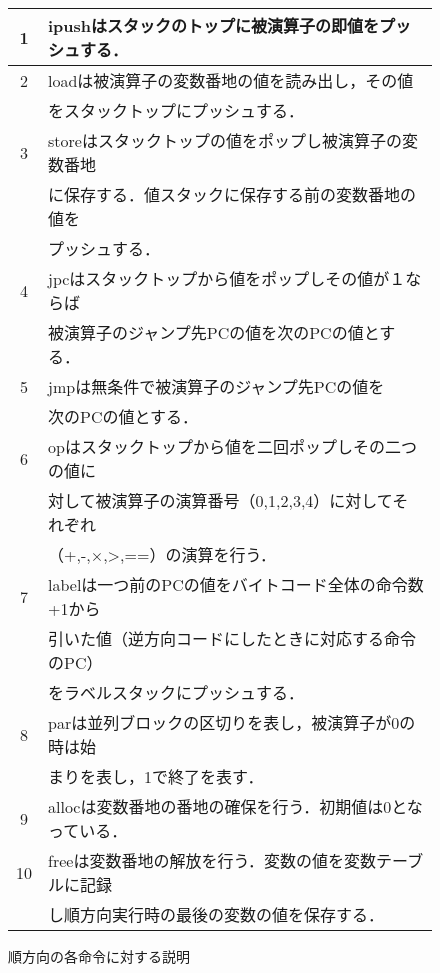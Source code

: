 \documentclass[submit,PRO]{ipsj}
\begin{document}
\begin{figure}[tb]
\caption{順方向の各命令に対する説明}
\label{tab:expfor}
\begin{center}
\begin{tabular}[t]{|c|l|}\hline
1 &ipushはスタックのトップに被演算子の即値をプッシュする． \\\hline

2 & loadは被演算子の変数番地の値を読み出し，その値\\

& をスタックトップにプッシュする．\\\hline

3& storeはスタックトップの値をポップし被演算子の変数番地\\ 

& に保存する．値スタックに保存する前の変数番地の値を\\ &プッシュする．\\\hline

4 &jpcはスタックトップから値をポップしその値が１ならば\\ & 被演算子のジャンプ先PCの値を次のPCの値とする． \\\hline

5& jmpは無条件で被演算子のジャンプ先PCの値を\\ & 次のPCの値とする．\\\hline



6& opはスタックトップから値を二回ポップしその二つの値に\\ &対して被演算子の演算番号（0,1,2,3,4）に対してそれぞれ\\ &（+,-,$\times$,>,==）の演算を行う．\\\hline


7& labelは一つ前のPCの値をバイトコード全体の命令数+1から\\ & 引いた値（逆方向コードにしたときに対応する命令のPC）\\ &をラベルスタックにプッシュする．\\\hline


8& parは並列ブロックの区切りを表し，被演算子が0の時は始\\ &まりを表し，1で終了を表す．\\\hline


9& allocは変数番地の番地の確保を行う．初期値は0となっている．\\\hline

10& freeは変数番地の解放を行う．変数の値を変数テーブルに記録\\ &し順方向実行時の最後の変数の値を保存する．\\\hline


\end{tabular}
\end{center}
\end{figure}
\end{document}

